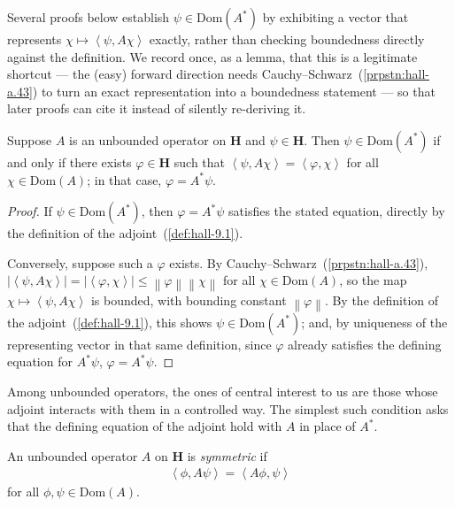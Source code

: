 Several proofs below establish $\psi \in \text{Dom}(A^*)$ by exhibiting a vector that represents $\chi \mapsto \left< \psi, A\chi \right>$ exactly, rather than checking boundedness directly against the definition. We record once, as a lemma, that this is a legitimate shortcut — the (easy) forward direction needs Cauchy–Schwarz~(\ref{prpstn:hall-a.43}) to turn an exact representation into a boundedness statement — so that later proofs can cite it instead of silently re-deriving it.

\begin{lemma}
    \label{lmm:characterizing-adjoint-domain-membership}
    \leanok
    Suppose $A$ is an unbounded operator on $\mathbf{H}$ and $\psi \in \mathbf{H}$. Then $\psi \in \text{Dom}(A^*)$ if and only if there exists $\varphi \in \mathbf{H}$ such that $\left< \psi, A\chi \right> = \left< \varphi, \chi \right>$ for all $\chi \in \text{Dom}(A)$; in that case, $\varphi = A^*\psi$.
\end{lemma}
\begin{proof}
    \leanok
If $\psi \in \text{Dom}(A^*)$, then $\varphi = A^*\psi$ satisfies the stated equation, directly by the definition of the adjoint~(\ref{def:hall-9.1}).

Conversely, suppose such a $\varphi$ exists. By Cauchy–Schwarz~(\ref{prpstn:hall-a.43}), $\lvert \left< \psi, A\chi \right> \rvert = \lvert \left< \varphi, \chi \right> \rvert \le \left\| \varphi \right\| \left\| \chi \right\|$ for all $\chi \in \text{Dom}(A)$, so the map $\chi \mapsto \left< \psi, A\chi \right>$ is bounded, with bounding constant $\left\| \varphi \right\|$. By the definition of the adjoint~(\ref{def:hall-9.1}), this shows $\psi \in \text{Dom}(A^*)$; and, by uniqueness of the representing vector in that same definition, since $\varphi$ already satisfies the defining equation for $A^*\psi$, $\varphi = A^*\psi$.
\end{proof}

Among unbounded operators, the ones of central interest to us are those whose adjoint interacts with them in a controlled way. The simplest such condition asks that the defining equation of the adjoint hold with $A$ in place of $A^*$.

\begin{definition}
    \label{def:hall-9.2}
    \leanok
    An unbounded operator $A$ on $\mathbf{H}$ is \textit{symmetric} if
    \begin{align}
        \left< \phi, A\psi \right> = \left< A\phi, \psi \right>
    \end{align}
    for all $\phi, \psi \in \text{Dom}(A)$.
\end{definition}

